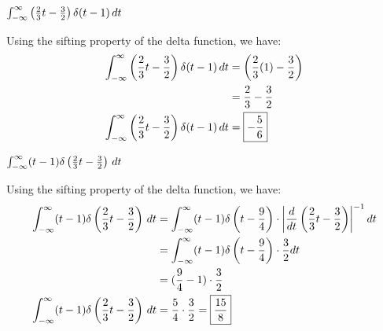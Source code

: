 \documentclass[a4paper, 10pt]{article}
\begin{document}
\begin{tosubmit}
\begin{subproblems}
    \item \( \int_{-\infty}^{\infty} \left(\frac{2}{3}t-\frac{3}{2}\right) \delta(t-1) \,dt \)
\end{subproblems}

\par\noindent\submitsolution
Using the sifting property of the delta function, we have:
\begin{align*}
    \int_{-\infty}^{\infty} \left(\frac{2}{3}t-\frac{3}{2}\right) \delta(t-1) \,dt &= \left(\frac{2}{3}(1)-\frac{3}{2}\right) \\
    &= \frac{2}{3} - \frac{3}{2} \\
    \int_{-\infty}^{\infty} \left(\frac{2}{3}t-\frac{3}{2}\right) \delta(t-1) \,dt &= \boxed{-\frac{5}{6}}
\end{align*}
\end{tosubmit}


\begin{subproblems}[start=2]
    \item \( \int_{-\infty}^{\infty} (t-1) \delta \left(\frac{2}{3}t- \frac{3}{2} \right) \,dt \)
\end{subproblems}

\begin{solution}
Using the sifting property of the delta function, we have:
\begin{align*}
    \int_{-\infty}^{\infty} (t-1) \delta \left(\frac{2}{3}t- \frac{3}{2} \right) \,dt &= \int_{-\infty}^{\infty} (t-1) \delta \left(t - \frac{9}{4}\right) \cdot \left| \frac{d}{dt} \left( \frac{2}{3}t - \frac{3}{2} \right) \right|^{-1} dt \\
    &= \int_{-\infty}^{\infty} (t-1) \delta \left(t - \frac{9}{4}\right) \cdot \frac{3}{2} dt \\
    &= ( \frac{9}{4} - 1 ) \cdot \frac{3}{2} \\
    \int_{-\infty}^{\infty} (t-1) \delta \left(\frac{2}{3}t- \frac{3}{2} \right) \,dt &= \frac{5}{4} \cdot \frac{3}{2} = \boxed{\frac{15}{8}}
\end{align*}
\end{solution}

\newpage
\end{document}
